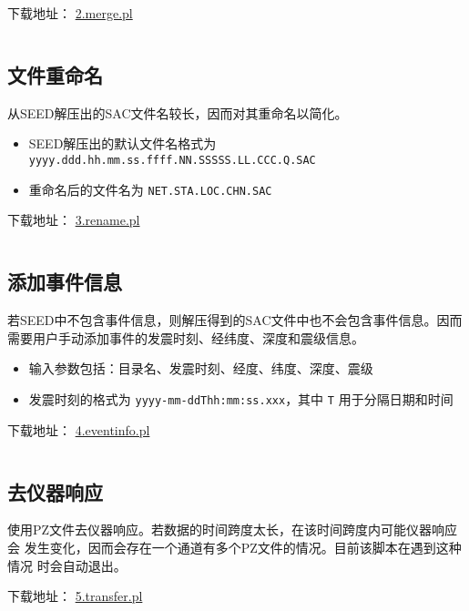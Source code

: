 下载地址： \href{https://raw.githubusercontent.com/seisman/SAC_Docs_zh/master/call-in-script/2.merge.pl}{2.merge.pl}
\inputminted{perl}{./call-in-script/2.merge.pl}

\subsection{文件重命名}
\label{subsec:rename-in-perl}
从SEED解压出的SAC文件名较长，因而对其重命名以简化。
\begin{itemize}
\item SEED解压出的默认文件名格式为 \texttt{yyyy.ddd.hh.mm.ss.ffff.NN.SSSSS.LL.CCC.Q.SAC}
\item 重命名后的文件名为 \texttt{NET.STA.LOC.CHN.SAC}
\end{itemize}

下载地址： \href{https://raw.githubusercontent.com/seisman/SAC_Docs_zh/master/call-in-script/3.rename.pl}{3.rename.pl}
\inputminted{perl}{./call-in-script/3.rename.pl}

\subsection{添加事件信息}
\label{subsec:event-info-perl}
若SEED中不包含事件信息，则解压得到的SAC文件中也不会包含事件信息。因而
需要用户手动添加事件的发震时刻、经纬度、深度和震级信息。
\begin{itemize}
\item 输入参数包括：目录名、发震时刻、经度、纬度、深度、震级
\item 发震时刻的格式为 \texttt{yyyy-mm-ddThh:mm:ss.xxx}，其中 \texttt{T}
    用于分隔日期和时间
\end{itemize}

下载地址： \href{https://raw.githubusercontent.com/seisman/SAC_Docs_zh/master/call-in-script/4.eventinfo.pl}{4.eventinfo.pl}
\inputminted{perl}{./call-in-script/4.eventinfo.pl}

\subsection{去仪器响应}
\label{subsec:transfer-perl}
使用PZ文件去仪器响应。若数据的时间跨度太长，在该时间跨度内可能仪器响应会
发生变化，因而会存在一个通道有多个PZ文件的情况。目前该脚本在遇到这种情况
时会自动退出。

下载地址： \href{https://raw.githubusercontent.com/seisman/SAC_Docs_zh/master/call-in-script/5.transfer.pl}{5.transfer.pl}
\inputminted{perl}{./call-in-script/5.transfer.pl}

